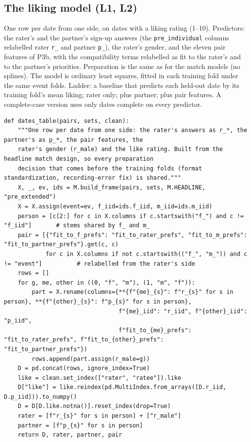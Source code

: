 \documentclass[11pt]{article}
\begin{document}
\subsection{The liking model (L1, L2)}

One row per date from one side, on dates with a liking rating (1--10). Predictors: the rater's and the partner's
sign-up answers (the \texttt{pre\_individual} columns relabelled rater \texttt{r\_} and partner \texttt{p\_}), the
rater's gender, and the eleven pair features of P3b, with the compatibility terms relabelled as fit to the rater's
and to the partner's priorities. Preparation is the same as for the match models (no splines). The model is ordinary
least squares, fitted in each training fold under the same event folds. Ladder: a baseline that predicts each
held-out date by its training fold's mean liking; rater only; plus partner; plus pair features. A complete-case
version uses only dates complete on every predictor.

\begin{lstlisting}[caption={One row per date from one side (scripts/like\_models.py)}]
def dates_table(pairs, sets, clean):
    """One row per date from one side: the rater's answers as r_*, the partner's as p_*, the pair features, the
    rater's gender (r_male) and the like rating. Built from the headline match design, so every preparation
    decision that comes before the training folds (format standardization, recording-error fix) is shared."""
    X, _, ev, ids = M.build_frame(pairs, sets, M.HEADLINE, "pre_extended")
    X = X.assign(event=ev, f_iid=ids.f_iid, m_iid=ids.m_iid)
    person = [c[2:] for c in X.columns if c.startswith("f_") and c != "f_iid"]       # stems shared by f_ and m_
    pair = [{"fit_to_f_prefs": "fit_to_rater_prefs", "fit_to_m_prefs": "fit_to_partner_prefs"}.get(c, c)
            for c in X.columns if not c.startswith(("f_", "m_")) and c != "event"]          # relabelled from the rater's side
    rows = []
    for g, me, other in ((0, "f", "m"), (1, "m", "f")):
        part = X.rename(columns={**{f"{me}_{s}": f"r_{s}" for s in person}, **{f"{other}_{s}": f"p_{s}" for s in person},
                                 f"{me}_iid": "r_iid", f"{other}_iid": "p_iid",
                                 f"fit_to_{me}_prefs": "fit_to_rater_prefs", f"fit_to_{other}_prefs": "fit_to_partner_prefs"})
        rows.append(part.assign(r_male=g))
    D = pd.concat(rows, ignore_index=True)
    like = clean.set_index(["rater", "ratee"]).like
    D["like"] = like.reindex(pd.MultiIndex.from_arrays([D.r_iid, D.p_iid])).to_numpy()
    D = D[D.like.notna()].reset_index(drop=True)
    rater = [f"r_{s}" for s in person] + ["r_male"]
    partner = [f"p_{s}" for s in person]
    return D, rater, partner, pair
\end{lstlisting}
\end{document}

